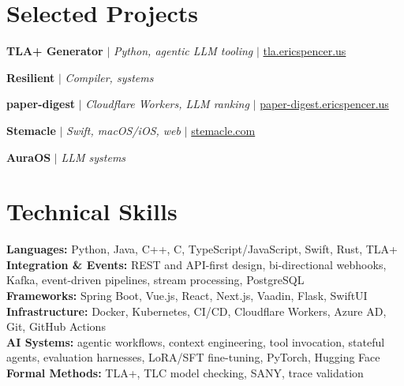 \documentclass[letterpaper,10pt]{article}
\begin{document}
\section*{Selected Projects}
\resumeSubHeadingListStart

\resumeProjectHeading
  {\textbf{TLA+ Generator} $|$ \emph{Python, agentic LLM tooling} $|$ \underline{tla.ericspencer.us}}{}
  \resumeItemListStart
  \resumeItemListEnd

\resumeProjectHeading
  {\textbf{Resilient} $|$ \emph{Compiler, systems}}{}
  \resumeItemListStart
  \resumeItemListEnd

\resumeProjectHeading
  {\textbf{paper-digest} $|$ \emph{Cloudflare Workers, LLM ranking} $|$ \underline{paper-digest.ericspencer.us}}{}
  \resumeItemListStart
  \resumeItemListEnd

\resumeProjectHeading
  {\textbf{Stemacle} $|$ \emph{Swift, macOS/iOS, web} $|$ \underline{stemacle.com}}{}
  \resumeItemListStart
  \resumeItemListEnd

\resumeProjectHeading
  {\textbf{AuraOS} $|$ \emph{LLM systems}}{}
  \resumeItemListStart
  \resumeItemListEnd

\resumeSubHeadingListEnd

\section*{Technical Skills}
\begin{itemize}[leftmargin=0.15in, label={}]
  \small{
    \item{
      \textbf{Languages:} Python, Java, C++, C, TypeScript/JavaScript, Swift, Rust, TLA+ \\
      \textbf{Integration \& Events:} REST and API-first design, bi-directional webhooks, Kafka, event-driven pipelines, stream processing, PostgreSQL \\
      \textbf{Frameworks:} Spring Boot, Vue.js, React, Next.js, Vaadin, Flask, SwiftUI \\
      \textbf{Infrastructure:} Docker, Kubernetes, CI/CD, Cloudflare Workers, Azure AD, Git, GitHub Actions \\
      \textbf{AI Systems:} agentic workflows, context engineering, tool invocation, stateful agents, evaluation harnesses, LoRA/SFT fine-tuning, PyTorch, Hugging Face \\
      \textbf{Formal Methods:} TLA+, TLC model checking, SANY, trace validation
    }
  }
\end{itemize}
\end{document}
